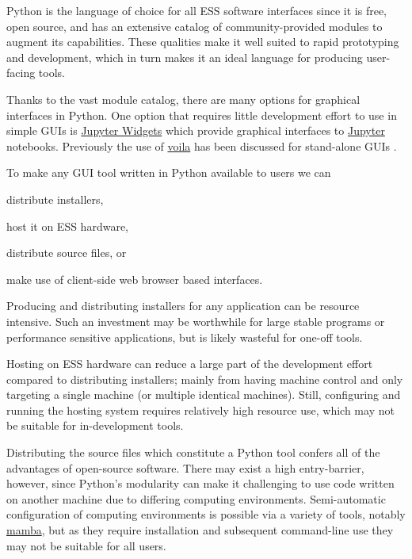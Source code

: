\documentclass[a4paper, twocolumn, 10pt, revision]{ess}
\begin{document}
Python is the language of choice for all ESS software interfaces since it is free, open source, and has an
extensive catalog of community-provided modules to augment its capabilities.
These qualities make it well suited to rapid prototyping and development,
which in turn makes it an ideal language for producing user-facing tools. %

Thanks to the vast module catalog, there are many options for graphical interfaces in Python.
One option that requires little development effort to use in simple GUIs is
\href{https://ipywidgets.readthedocs.io/}{Jupyter Widgets}
which provide graphical interfaces to
\href{https://jupyter.org/}{Jupyter} notebooks.
Previously the use of \href{https://voila.readthedocs.io/}{voila} has been discussed for stand-alone GUIs \autocite{tucker_spectroscopy_stap_april_2022}.

To make any GUI tool written in Python available to users we can 
\begin{inparaenum}
\item distribute installers,
\item host it on ESS hardware,
\item distribute source files, or
\item make use of client-side web browser based interfaces.
\end{inparaenum}

Producing and distributing installers for any application can be resource intensive.
Such an investment may be worthwhile for large stable programs or performance sensitive applications,
but is likely wasteful for one-off tools.

Hosting on ESS hardware can reduce a large part of the development effort compared to distributing installers;
mainly from having machine control and only targeting a single machine (or multiple identical machines).
Still, configuring and running the hosting system requires relatively high resource use,
which may not be suitable for in-development tools.

Distributing the source files which constitute a Python tool confers all of the advantages of open-source software.
There may exist a high entry-barrier, however, since Python's modularity can make it challenging to use code written on another machine due to differing computing environments.
Semi-automatic configuration of computing environments is possible via a variety of tools, notably
\href{https://github.com/conda-forge/miniforge}{mamba},
but as they require installation and subsequent command-line use they may not be suitable for all users.
\end{document}
